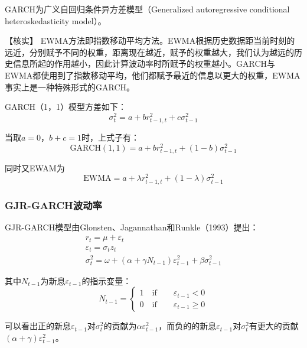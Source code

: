 \documentclass[11pt]{article}
\begin{document}
GARCH为广义自回归条件异方差模型（Generalized autoregressive conditional heteroskedasticity model）。

【核实】
EWMA方法即指数移动平均方法。EWMA根据历史数据距当前时刻的远近，分别赋予不同的权重，距离现在越近，赋予的权重越大，我们认为越远的历史信息所起的作用越小，因此计算波动率时所赋予的权重越小。GARCH与EWMA都使用到了指数移动平均，他们都赋予最近的信息以更大的权重，EWMA事实上是一种特殊形式的GARCH。

GARCH（1，1）模型方差如下：
\begin{equation*}
    \sigma^{2}_{t} = a + b r^{2}_{t-1,t} + c \sigma^{2}_{t-1}
\end{equation*}

当取$a=0$，$b+c=1$时，上式子有：
\begin{equation*}
    \text{GARCH}(1,1) = a + b r^{2}_{t-1,t} + (1-b) \sigma^{2}_{t-1}
\end{equation*}

同时又EWAM为
\begin{equation*}
    \text{EWMA} = a + \lambda r^{2}_{t-1,t} + (1-\lambda) \sigma^{2}_{t-1}
\end{equation*}

\subsubsection{GJR-GARCH波动率}

GJR-GARCH模型由Glonsten、Jagannathan和Runkle（1993）提出：
\begin{gather*}
    r_t = \mu + \varepsilon_t \\
    \varepsilon_t = \sigma_t z_t \\
    \sigma^2_t = \omega + \left( \alpha + \gamma N_{t-1} \right) \varepsilon_{t-1}^2 + \beta \sigma_{t-1}^2
\end{gather*}

其中$N_{t-1}$为新息$\varepsilon_{t-1}$的指示变量：
\begin{equation*}
    N_{t-1} = 
    \begin{cases}
        1 \quad\text{if}\qquad \varepsilon_{t-1} < 0 \\
        0 \quad\text{if}\qquad \varepsilon_{t-1} \geq 0
    \end{cases}
\end{equation*}

可以看出正的新息$\varepsilon_{t-1}$对$\sigma_t^2$的贡献为$\alpha \varepsilon_{t-1}^2$，而负的的新息$\varepsilon_{t-1}$对$\sigma_t^2$有更大的贡献$\left(\alpha+\gamma\right) \varepsilon_{t-1}^2$。
\end{document}

